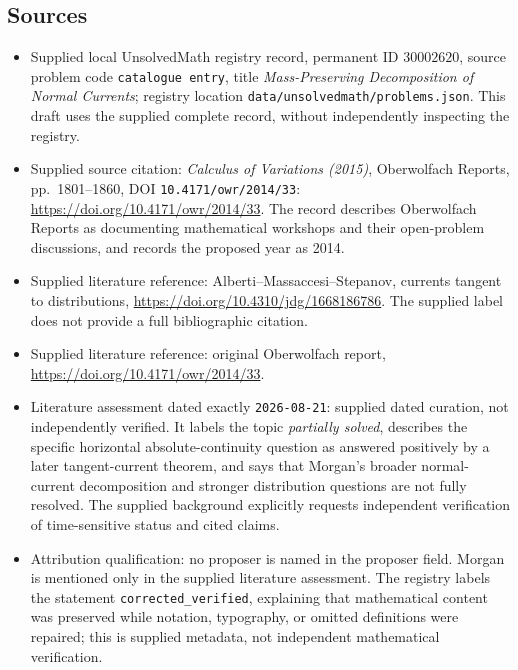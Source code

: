 \documentclass[11pt]{article}
\begin{document}
\subsection{Sources}
\begin{itemize}
\item Supplied local UnsolvedMath registry record, permanent ID \(30002620\), source problem code \texttt{catalogue entry}, title \emph{Mass-Preserving Decomposition of Normal Currents}; registry location \texttt{data/unsolvedmath/problems.json}. This draft uses the supplied complete record, without independently inspecting the registry.
\item Supplied source citation: \emph{Calculus of Variations (2015)}, Oberwolfach Reports, pp.~1801--1860, DOI \texttt{10.4171/owr/2014/33}: \url{https://doi.org/10.4171/owr/2014/33}. The record describes Oberwolfach Reports as documenting mathematical workshops and their open-problem discussions, and records the proposed year as 2014.
\item Supplied literature reference: Alberti--Massaccesi--Stepanov, currents tangent to distributions, \url{https://doi.org/10.4310/jdg/1668186786}. The supplied label does not provide a full bibliographic citation.
\item Supplied literature reference: original Oberwolfach report, \url{https://doi.org/10.4171/owr/2014/33}.
\item Literature assessment dated exactly \texttt{2026-08-21}: supplied dated curation, not independently verified. It labels the topic \emph{partially solved}, describes the specific horizontal absolute-continuity question as answered positively by a later tangent-current theorem, and says that Morgan's broader normal-current decomposition and stronger distribution questions are not fully resolved. The supplied background explicitly requests independent verification of time-sensitive status and cited claims.
\item Attribution qualification: no proposer is named in the proposer field. Morgan is mentioned only in the supplied literature assessment. The registry labels the statement \texttt{corrected\_verified}, explaining that mathematical content was preserved while notation, typography, or omitted definitions were repaired; this is supplied metadata, not independent mathematical verification.
\end{itemize}
\end{document}
